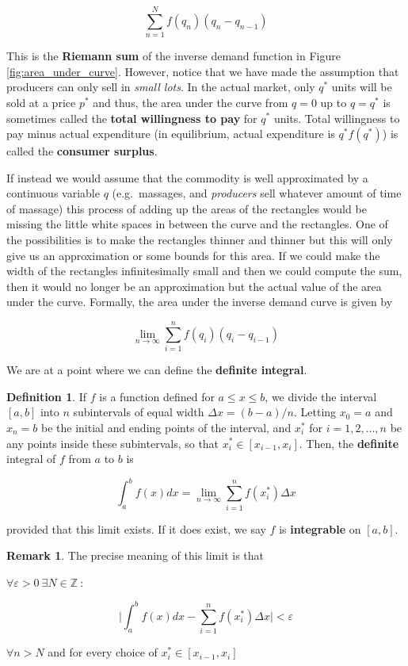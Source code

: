 \documentclass[a4paper,11pt]{article}
\theoremstyle{definition}
\newtheorem{definition}{Definition}
\newtheorem{remark}{Remark}
\theoremstyle{plain}
\begin{document}
\[
\sum^N_{n=1} f(q_n)(q_n - q_{n-1})
\]

This is the \textbf{Riemann sum} of the inverse demand function in Figure \ref{fig:area_under_curve}. However, notice that we have made the assumption that producers can only sell in \emph{small lots}. In the actual market, only \(q^*\) units will be sold at a price \(p^*\) and thus, the area under the curve from \(q = 0\) up to \(q = q^*\) is
sometimes called the \textbf{total willingness to pay} for \(q^*\) units. Total willingness to pay minus actual expenditure (in equilibrium, actual expenditure is \(q^* f(q^*)\)) is called the \textbf{consumer surplus}.

If instead we would assume that the commodity is well approximated by a continuous variable \(q\) (e.g.~massages, and \emph{producers} sell whatever amount of time of massage) this process of adding up the areas of the rectangles would be missing the little white spaces in between the curve and the rectangles. One of the possibilities is to make the rectangles thinner and thinner but this will only give us an approximation or some bounds for this area. If we could make the width of the rectangles infinitesimally small and then we could compute the sum, then it would no longer be an approximation but the actual value of the area under the curve. Formally, the area under the inverse demand curve is given by

\[
\lim_{n\rightarrow \infty} \sum^n_{i=1} f(q_i)(q_i-q_{i-1})
\]

We are at a point where we can define the \textbf{definite integral}.

\begin{definition}
If \(f\) is a function defined for \(a\leq x \leq b\), we divide the interval \([a,b]\) into \(n\) subintervals of equal width \(\Delta x = (b-a)/n\). Letting \(x_0 = a\) and \(x_n = b\) be the initial and ending points of the interval, and \(x_i^*\) for \(i=1,2,\ldots,n\) be any points inside these subintervals, so that \(x_i^*\in[x_{i-1},x_i]\). Then, the \textbf{definite} integral of \(f\) from \(a\) to \(b\) is

\[
\int^b_a f(x) dx = \lim_{n\rightarrow\infty} \sum_{i=1}^n f(x_i^*)\Delta x
\]

provided that this limit exists. If it does exist, we say \(f\) is \textbf{integrable} on \([a,b]\).
\end{definition}

\begin{remark}
The precise meaning of this limit is that

\(\forall\varepsilon > 0 \ \exists N\in\mathbb{Z} \ : \ \) 

	\[
    \Bigg\lvert \int^b_a f(x) dx - \sum_{i=1}^n f(x_i^*)\Delta x \Bigg\rvert < \varepsilon
    \]

\(\forall n > N\) and for every choice of \(x_i^*\in[x_{i-1}, x_i]\)
\end{remark}
\end{document}
